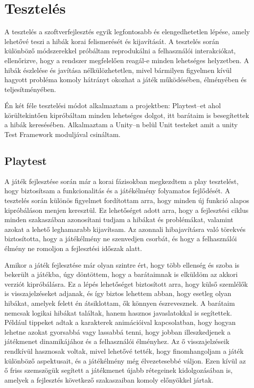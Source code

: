 \documentclass[
]{thesis-ekf}
\theoremstyle{definition}
\theoremstyle{remark}
\begin{document}
\chapter{Tesztelés}
A tesztelés a szoftverfejlesztés egyik legfontosabb és elengedhetetlen lépése, amely lehetővé teszi a hibák korai felismerését és kijavítását. A tesztelés során különböző módszerekkel próbáltam reprodukálni a felhasználói interakciókat, ellenőrizve, hogy a rendszer megfelelően reagál-e minden lehetséges helyzetben. A hibák észlelése és javítása nélkülözhetetlen, mivel bármilyen figyelmen kívül hagyott probléma komoly hátrányt okozhat a játék működésében, élményében és teljesítményében.
 
Én két féle tesztelési módot alkalmaztam a projektben: Playtest--et ahol körültekintően kipróbáltam minden lehetséges dolgot, itt barátaim is besegítettek a hibák keresésében. Alkalmaztam a Unity--n belül Unit testeket amit a unity Test Framework moduljával csináltam.
\section{Playtest}
A játék fejlesztése során már a korai fázisokban megkezdtem a play tesztelést, hogy biztosítsam a funkcionalitás és a játékélmény folyamatos fejlődését. A tesztelés során különös figyelmet fordítottam arra, hogy minden új funkció alapos kipróbáláson menjen keresztül. Ez lehetőséget adott arra, hogy a fejlesztési ciklus minden szakaszában azonosítani tudjam a hibákat és problémákat, valamint azokat a lehető leghamarabb kijavítsam. Az azonnali hibajavításra való törekvés biztosította, hogy a játékélmény ne szenvedjen csorbát, és hogy a felhasználói élmény ne romoljon a fejlesztési időszak alatt.

Amikor a játék fejlesztése már olyan szintre ért, hogy több ellenség és szoba is bekerült a játékba, úgy döntöttem, hogy a barátaimnak is elküldöm az akkori verziót kipróbálásra. Ez a lépés lehetőséget biztosított arra, hogy külső szemlélők is visszajelzéseket adjanak, és így biztos lehettem abban, hogy esetleg olyan hibákat, amelyek felett én átsiklottam, ők könnyen észrevesznek. A barátaim nemcsak logikai hibákat találtak, hanem hasznos javaslatokkal is segítettek. Például tippeket adtak a karakterek animációival kapcsolatban, hogy hogyan lehetne azokat gyorsabbá vagy lassabbá tenni, hogy jobban illeszkedjenek a játékmenet dinamikájához és a felhasználói élményhez. Az ő visszajelzéseik rendkívül hasznosak voltak, mivel lehetővé tették, hogy finomhangoljam a játék különböző aspektusait, és a játékélmény még élvezetesebbé váljon. Ezen kívül az ő friss szemszögük segített a játékmenet újabb rétegeinek kidolgozásában is, amelyek a fejlesztés következő szakaszaiban komoly előnyökkel jártak.
\end{document}
